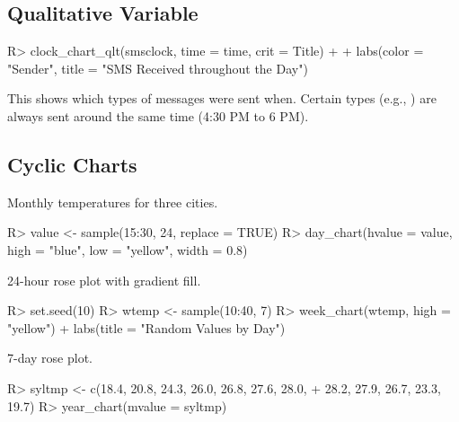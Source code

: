 \documentclass[article]{jss}
\begin{document}
\subsection{Qualitative Variable}

\begin{Schunk}
\begin{Sinput}
R> clock_chart_qlt(smsclock, time = time, crit = Title) +
+    labs(color = "Sender", title = "SMS Received throughout the Day")
\end{Sinput}
\end{Schunk}

This shows which types of messages were sent when. Certain types (e.g., ) are always sent around the same time (4:30 PM to 6 PM).

\subsection{Cyclic Charts}

\begin{Schunk}
\end{Schunk}

Monthly temperatures for three cities.

\begin{Schunk}
\begin{Sinput}
R> value <- sample(15:30, 24, replace = TRUE)
R> day_chart(hvalue = value, high = "blue", low = "yellow", width = 0.8)
\end{Sinput}
\end{Schunk}

24-hour rose plot with gradient fill.

\begin{Schunk}
\begin{Sinput}
R> set.seed(10)
R> wtemp <- sample(10:40, 7)
R> week_chart(wtemp, high = "yellow") + labs(title = "Random Values by Day")
\end{Sinput}
\end{Schunk}

7-day rose plot.

\begin{Schunk}
\begin{Sinput}
R> syltmp <- c(18.4, 20.8, 24.3, 26.0, 26.8, 27.6, 28.0,
+              28.2, 27.9, 26.7, 23.3, 19.7)
R> year_chart(mvalue = syltmp)
\end{Sinput}
\end{Schunk}
\end{document}
